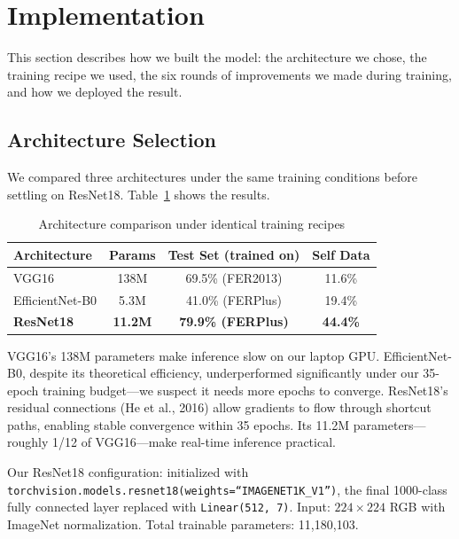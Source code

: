 \documentclass[12pt,a4paper]{article}
\begin{document}
\section{Implementation}

This section describes how we built the model: the architecture we chose, the training recipe we used, the six rounds of improvements we made during training, and how we deployed the result.

\subsection{Architecture Selection}

We compared three architectures under the same training conditions before settling on ResNet18. Table~\ref{tab:arch_compare} shows the results.

\begin{table}[H]
\centering
\caption{Architecture comparison under identical training recipes}
\label{tab:arch_compare}
\begin{tabular}{lccc}
\toprule
Architecture & Params & Test Set (trained on) & Self Data \\
\midrule
VGG16       & 138M  & 69.5\% (FER2013)  & 11.6\% \\
EfficientNet-B0 & 5.3M & 41.0\% (FERPlus)  & 19.4\% \\
\textbf{ResNet18} & \textbf{11.2M} & \textbf{79.9\% (FERPlus)} & \textbf{44.4\%} \\
\bottomrule
\end{tabular}
\end{table}

VGG16's 138M parameters make inference slow on our laptop GPU. EfficientNet-B0, despite its theoretical efficiency, underperformed significantly under our 35-epoch training budget---we suspect it needs more epochs to converge. ResNet18's residual connections (He et al., 2016) allow gradients to flow through shortcut paths, enabling stable convergence within 35 epochs. Its 11.2M parameters---roughly 1/12 of VGG16---make real-time inference practical.

Our ResNet18 configuration: initialized with \texttt{torchvision.models.resnet18(weights=``IMAGENET1K\_V1'')}, the final 1000-class fully connected layer replaced with \texttt{Linear(512, 7)}. Input: $224\times224$ RGB with ImageNet normalization. Total trainable parameters: 11,180,103.
\end{document}

